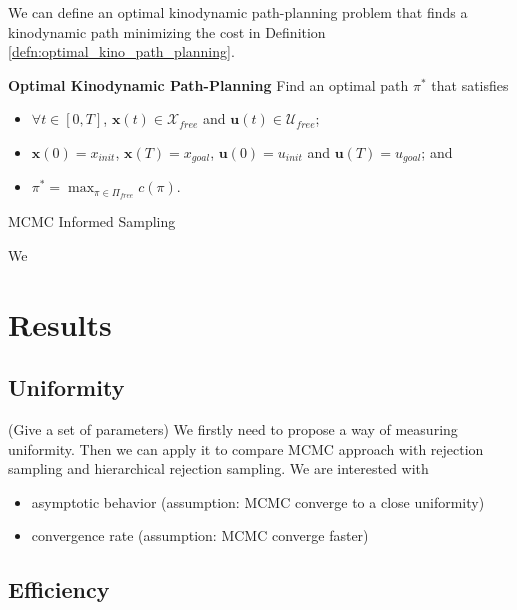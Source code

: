 \documentclass[letterpaper, 10 pt, conference]{ieeeconf}  %
\begin{document}
We can define an optimal kinodynamic path-planning problem that finds a kinodynamic path minimizing the cost in Definition \ref{defn:optimal_kino_path_planning}.
\begin{defn}{ \textbf{Optimal Kinodynamic Path-Planning} }
\label{defn:optimal_kino_path_planning}
	Find an optimal path $  \pi^* $ that satisfies
	\begin{itemize}
	\item $\forall t \in [0,T] $, $ \bm{x} (t) \in \mathcal{X}_{free}  $ and $ \bm{u} (t) \in \mathcal{U}_{free} $;
	\item $ \bm{x} (0) = x_{init} $, $ \bm{x} (T) = x_{goal} $, $ \bm{u} (0) = u_{init} $ and $ \bm{u} (T) = u_{goal} $; and
	\item $ \pi^* = \max_{ \pi \in \Pi_{free} } c( \pi ) $. 
	\end{itemize}
\end{defn}


\begin{algorithm}
	\begin{algorithmic}[1]
		\STATE
   	\end{algorithmic}
	\caption{MCMC Informed Sampling}
	\label{alg:mcmc_informed_sampling}
\end{algorithm}

We 



\section{Results}

\subsection{Uniformity}

(Give a set of parameters)
We firstly need to propose a way of measuring uniformity.
Then we can apply it to compare MCMC approach with rejection sampling and hierarchical rejection sampling.
We are interested with
\begin{itemize}
	\item asymptotic behavior (assumption: MCMC converge to a close uniformity)
	\item convergence rate (assumption: MCMC converge faster)
\end{itemize}

\subsection{Efficiency}
\end{document}
